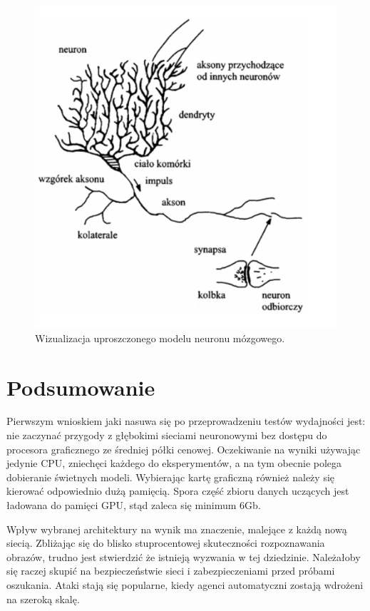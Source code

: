 \documentclass[12pt,a4paper,twoside,titlepage,openright]{book}
\begin{document}
\begin{figure}[ht]
	\centering
			\includegraphics[resolution=100, scale=0.7]{neuronMozgowy.png}
		\caption{Wizualizacja uproszczonego modelu neuronu mózgowego.}
\end{figure}


\section{Podsumowanie}
Pierwszym wnioskiem jaki nasuwa się po przeprowadzeniu testów wydajności jest: nie zaczynać przygody z głębokimi sieciami neuronowymi bez dostępu do procesora graficznego ze średniej półki cenowej. Oczekiwanie na wyniki używając jedynie CPU, zniechęci każdego do eksperymentów, a na tym obecnie polega dobieranie świetnych modeli. Wybierając kartę graficzną również należy się kierować odpowiednio dużą pamięcią. Spora część zbioru danych uczących jest ładowana do pamięci GPU, stąd zaleca się minimum 6Gb.

Wpływ wybranej architektury na wynik ma znaczenie, malejące z każdą nową siecią. Zbliżając się do blisko stuprocentowej skuteczności rozpoznawania obrazów, trudno jest stwierdzić że istnieją wyzwania w tej dziedzinie. Należałoby się raczej skupić na bezpieczeństwie sieci i zabezpieczeniami przed próbami oszukania. Ataki stają się popularne, kiedy agenci automatyczni zostają wdrożeni na szeroką skalę.
\end{document}
